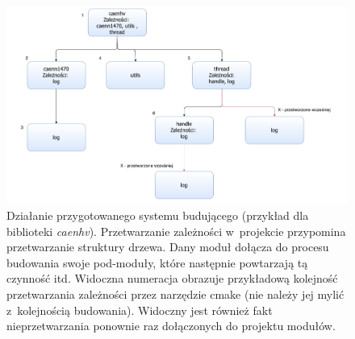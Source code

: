 \begin{figure}
\centering
\includegraphics[width=\textwidth]{res/CMakeOrder.pdf}
\caption{Działanie przygotowanego systemu budującego (przykład dla biblioteki \textit{caenhv}). Przetwarzanie zależności w~projekcie przypomina przetwarzanie struktury drzewa. Dany moduł dołącza do procesu budowania swoje pod-moduły, które następnie powtarzają tą czynność itd. Widoczna numeracja obrazuje przykładową kolejność przetwarzania zależności przez narzędzie \gls*{cmake} (nie należy jej mylić z~kolejnością budowania). Widoczny jest również fakt nieprzetwarzania ponownie raz dołączonych do projektu modułów.}
\label{fig:cmakeorder}
\end{figure}


